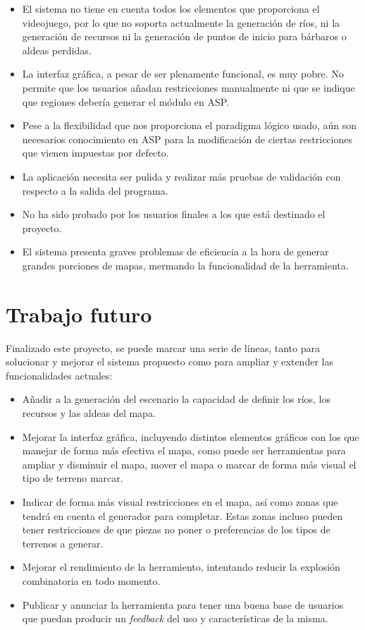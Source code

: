 \begin{itemize}
	\item El sistema no tiene en cuenta todos los elementos que proporciona el videojuego, por lo que no soporta actualmente la generación de ríos, ni la generación de recursos ni la generación de puntos de inicio para bárbaros o aldeas perdidas.
	\item La interfaz gráfica, a pesar de ser plenamente funcional, es muy pobre. No permite que los usuarios añadan restricciones manualmente ni que se indique que regiones debería generar el módulo en ASP.
	\item Pese a la flexibilidad que nos proporciona el paradigma lógico usado, aún son necesarios conocimiento en ASP para la modificación de ciertas restricciones que vienen impuestas por defecto.
	\item La aplicación necesita ser pulida y realizar más pruebas de validación con respecto a la salida del programa.
	\item No ha sido probado por los usuarios finales a los que está destinado el proyecto.
	\item El sistema presenta graves problemas de eficiencia a la hora de generar grandes porciones de mapas, mermando la funcionalidad de la herramienta.
\end{itemize}

\section{Trabajo futuro}

Finalizado este proyecto, se puede marcar una serie de líneas, tanto para solucionar y mejorar el sistema propuesto como para ampliar y extender las funcionalidades actuales:

\begin{itemize}
	\item Añadir a la generación del escenario la capacidad de definir los ríos, los recursos y las aldeas del mapa.
	\item Mejorar la interfaz gráfica, incluyendo distintos elementos gráficos con los que manejar de forma más efectiva el mapa, como puede ser herramientas para ampliar y disminuir el mapa, mover el mapa o marcar de forma más visual el tipo de terreno marcar.
	\item Indicar de forma más visual restricciones en el mapa, así como zonas que tendrá en cuenta el generador para completar. Estas zonas incluso pueden tener restricciones de que piezas no poner o preferencias de los tipos de terrenos a generar.
	\item Mejorar el rendimiento de la herramiento, intentando reducir la explosión combinatoria en todo momento.
	\item Publicar y anunciar la herramienta para tener una buena base de usuarios que puedan producir un \textit{feedback} del uso y características de la misma.
\end{itemize}